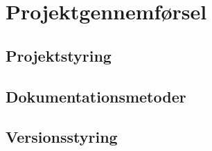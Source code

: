 \thispagestyle{fancy}
\chapter{Projektgennemførsel}
\label{chp:projektgennemforsel}

\section{Projektstyring}
\label{sec:projektstyring}

\section{Dokumentationsmetoder}
\label{sec:dokumentationsmetoder}

\section{Versionsstyring}
\label{sec:versionsstyring}